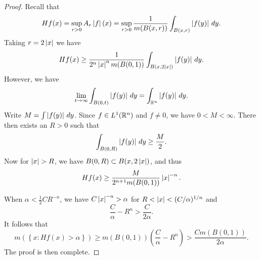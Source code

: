 \documentclass[a4paper]{article}
\begin{document}
\begin{proof}
Recall that 
\[
H f (x) 
= \sup_{r > 0} A_r \left\lvert f\right\rvert (x)
= \sup_{r > 0} \frac{1}{m( B(x, r) )} \int_{B(x, r)} \left\lvert f(y)\right\rvert
\, d y.
\]
Taking $r = 2 \left\lvert x\right\rvert$ we have 
\[
\begin{aligned}
H f (x)
\geq \frac{1}{2^n \left\lvert x\right\rvert^n m( B(0, 1) )} 
\int_{B(x, 2 \left\lvert x\right\rvert)} \left\lvert f(y)\right\rvert \, d y. 
\end{aligned}
\]
However, we have 
\[
\lim_{t \to \infty} \int_{B(0, t)} \left\lvert f(y)\right\rvert \, d y 
= \int_{\mathbb{R}^n} \left\lvert f(y)\right\rvert \, d y.
\]
Write $M = \int \left\lvert f(y)\right\rvert \, d y$. Since $f \in L^1 (\mathbb{R}^n)$
and $f \neq 0$, we have $0 < M < \infty$. There then 
exists an $R > 0$ such that 
\[
\int_{ B(0, R) } \left\lvert f(y)\right\rvert \, d y \geq \frac{M}{2}.
\]
Now for $\left\lvert x\right\rvert > R$, we have $B(0, R) \subset B(x, 2 \left\lvert x\right\rvert)$,
and thus 
\[
H f(x) \geq \frac{M}{2^{n + 1} m( B(0, 1) )} \left\lvert x\right\rvert^{-n}.
\]

When $\alpha < \frac{1}{2} C R^{-n}$, we have 
$C \left\lvert x\right\rvert^{-n} > \alpha$ for $R < \left\lvert x\right\rvert < (C / \alpha)^{1 / n}$
and
\[
\frac{C}{\alpha} - R^n > \frac{C}{2 \alpha}.
\]
It follows that 
\[
m (\left\{ x : H f(x) > \alpha \right\})
\geq m( B(0, 1) ) \left( \frac{C}{\alpha} - R^n \right)
> \frac{C m ( B(0, 1) )}{2 \alpha}.
\]
The proof is then complete.
\end{proof}
\end{document}
